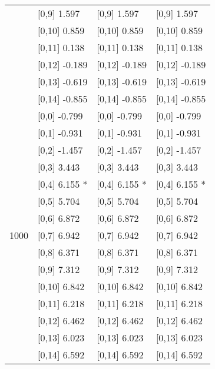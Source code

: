 \begin{table}
\begin{tabular}[t]{llll}
 & {}[0,9] 1.597 & {}[0,9] 1.597 & {}[0,9] 1.597\\
\addlinespace
 & {}[0,10] 0.859 & {}[0,10] 0.859 & {}[0,10] 0.859\\
 & {}[0,11] 0.138 & {}[0,11] 0.138 & {}[0,11] 0.138\\
 & {}[0,12] -0.189 & {}[0,12] -0.189 & {}[0,12] -0.189\\
 & {}[0,13] -0.619 & {}[0,13] -0.619 & {}[0,13] -0.619\\
 & {}[0,14] -0.855 & {}[0,14] -0.855 & {}[0,14] -0.855\\
\addlinespace
 & {}[0,0] -0.799 & {}[0,0] -0.799 & {}[0,0] -0.799\\
 & {}[0,1] -0.931 & {}[0,1] -0.931 & {}[0,1] -0.931\\
 & {}[0,2] -1.457 & {}[0,2] -1.457 & {}[0,2] -1.457\\
 & {}[0,3] 3.443 & {}[0,3] 3.443 & {}[0,3] 3.443\\
 & {}[0,4] 6.155 * & {}[0,4] 6.155 * & {}[0,4] 6.155 *\\
\addlinespace
 & {}[0,5] 5.704 & {}[0,5] 5.704 & {}[0,5] 5.704\\
 & {}[0,6] 6.872 & {}[0,6] 6.872 & {}[0,6] 6.872\\
1000 & {}[0,7] 6.942 & {}[0,7] 6.942 & {}[0,7] 6.942\\
 & {}[0,8] 6.371 & {}[0,8] 6.371 & {}[0,8] 6.371\\
 & {}[0,9] 7.312 & {}[0,9] 7.312 & {}[0,9] 7.312\\
\addlinespace
 & {}[0,10] 6.842 & {}[0,10] 6.842 & {}[0,10] 6.842\\
 & {}[0,11] 6.218 & {}[0,11] 6.218 & {}[0,11] 6.218\\
 & {}[0,12] 6.462 & {}[0,12] 6.462 & {}[0,12] 6.462\\
 & {}[0,13] 6.023 & {}[0,13] 6.023 & {}[0,13] 6.023\\
 & {}[0,14] 6.592 & {}[0,14] 6.592 & {}[0,14] 6.592\\
\bottomrule
\end{tabular}
\end{table}
